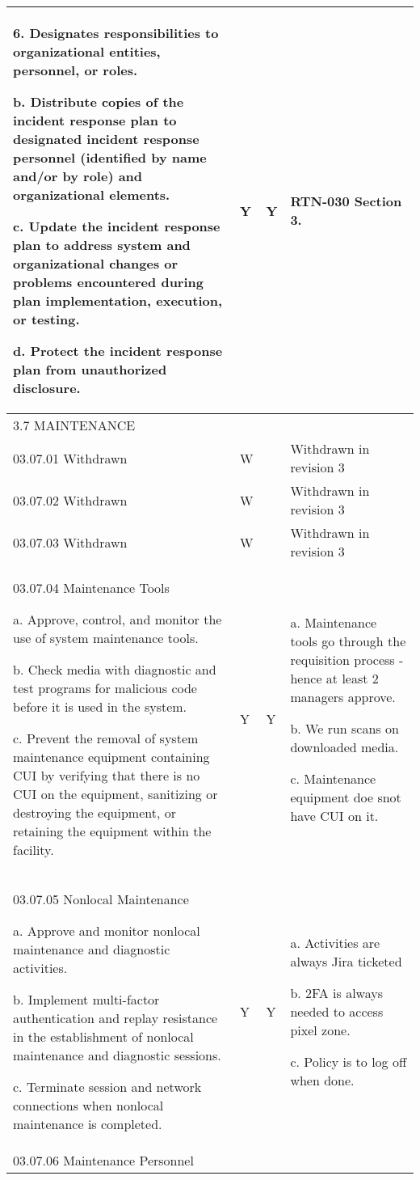\begin{longtable} {|p{}|p{}|p{}|p{} |}
{6. Designates responsibilities to organizational entities, personnel, or roles.

b. Distribute copies of the incident response plan to designated incident response personnel (identified by name and/or by role) and organizational elements.

c. Update the incident response plan to address system and organizational changes or problems encountered during plan implementation, execution, or testing.

d. Protect the incident response plan from unauthorized disclosure.}&{Y}&{Y}&{RTN-030 Section 3.} \\ \hline
{3.7 MAINTENANCE}&&& \\ \hline
{03.07.01 Withdrawn}&{W}&{ }&{Withdrawn in revision 3} \\ \hline
{03.07.02 Withdrawn}&{W}&{ }&{Withdrawn in revision 3} \\ \hline
{03.07.03 Withdrawn}&{W}&{ }&{Withdrawn in revision 3} \\ \hline
{03.07.04 Maintenance Tools

a. Approve, control, and monitor the use of system maintenance tools.

b. Check media with diagnostic and test programs for malicious code before it is used in the system.

c. Prevent the removal of system maintenance equipment containing CUI by verifying that there is no CUI on the equipment, sanitizing or destroying the equipment, or retaining the equipment within the facility.}&{Y}&{Y}&{a. Maintenance tools go through the requisition process - hence at least 2 managers approve. 

b. We run scans on downloaded media.

c. Maintenance equipment doe snot have CUI on it. } \\ \hline
{03.07.05 Nonlocal Maintenance

a. Approve and monitor nonlocal maintenance and diagnostic activities.

b. Implement multi-factor authentication and replay resistance in the establishment of nonlocal maintenance and diagnostic sessions.

c. Terminate session and network connections when nonlocal maintenance is completed.}&{Y}&{Y}&{a. Activities are always Jira ticketed

b. 2FA is always needed to access pixel zone.

c. Policy is to log off when done.} \\ \hline
{03.07.06 Maintenance Personnel

}
\end{longtable}
